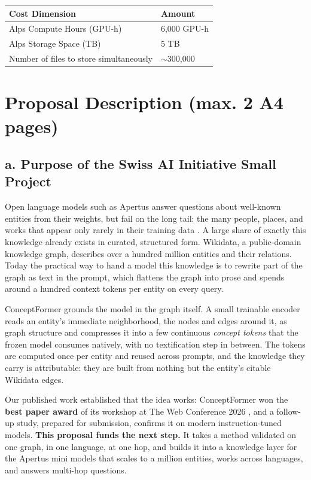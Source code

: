\documentclass[11pt,a4paper]{article}
\begin{document}
\begin{titlepage}
\begin{table}[h]
    \centering
    \begin{tabular}{|l|l|}
        \hline
        \textbf{Cost Dimension} & \textbf{Amount} \\
        \hline
        Alps Compute Hours (GPU-h) & 6,000 GPU-h \\
        \hline
        Alps Storage Space (TB) & 5 TB\\
        \hline
        Number of files to store simultaneously & $\sim$300,000 \\
        \hline
    \end{tabular}
\end{table}

\end{titlepage}

\newpage

\section*{Proposal Description (max. 2 A4 pages)}

\subsection*{a. Purpose of the Swiss AI Initiative Small Project}
Open language models such as Apertus answer questions about well-known entities from their
weights, but fail on the long tail: the many people, places, and works that appear only rarely
in their training data \cite{emptyshelves}. A large share of exactly this knowledge already
exists in curated, structured form. Wikidata, a public-domain knowledge graph, describes over a
hundred million entities and their relations. Today the practical way to hand a model this
knowledge is to rewrite part of the graph as text in the prompt, which flattens the graph into
prose and spends around a hundred context tokens per entity on every query.

ConceptFormer grounds the model in the graph itself. A small trainable encoder reads an
entity's immediate neighborhood, the nodes and edges around it, as graph structure and
compresses it into a few continuous \emph{concept tokens} that the frozen model consumes
natively, with no textification step in between. The tokens are computed once per entity and
reused across prompts, and the knowledge they carry is attributable: they are built from
nothing but the entity's citable Wikidata edges.

Our published work established that the idea works: ConceptFormer won the \textbf{best paper
award} of its workshop at The Web Conference 2026 \cite{cfv1}, and a follow-up study, prepared
for submission, confirms it on modern instruction-tuned models. \textbf{This proposal funds the
next step.} It takes a method validated on one graph, in one language, at one hop, and builds
it into a knowledge layer for the Apertus mini models \cite{apertus} that scales to a million
entities, works across languages, and answers multi-hop questions.
\end{document}
